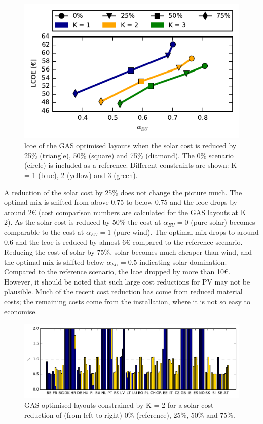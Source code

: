 \documentclass[a4paper, 5p, sort&compress]{elsarticle}%
\begin{document}
\begin{figure}[h!]
  \centering
  \includegraphics[width = \columnwidth]{solarAnalysis-new}
  \caption{\gls{lcoe} of the GAS optimised layouts when the solar cost is
    reduced by 25\% (triangle), 50\% (square) and 75\% (diamond). The
    0\% scenario (circle) is included as a reference. Different
    constraints are shown: K = 1 (blue), 2 (yellow) and 3 (green).}
  \label{fig:red-solar}
\end{figure}

A reduction of the solar cost by 25\% does not change the picture
much. The optimal mix is shifted from above 0.75 to below 0.75 and the
\gls{lcoe} drops by around 2\euro{} (cost comparison numbers are calculated
for the GAS layouts at K = 2).  As the solar cost is reduced by 50\%
the cost at $\alpha_{EU} = 0$ (pure solar) becomes comparable to the
cost at $\alpha_{EU} = 1$ (pure wind). The optimal mix drops to around
0.6 and the \gls{lcoe} is reduced by almost 6\euro{} compared to the
reference scenario. Reducing the cost of solar by 75\%, solar becomes
much cheaper than wind, and the optimal mix is shifted below
$\alpha_{EU} = 0.5$ indicating solar domination. Compared to the
reference scenario, the \gls{lcoe} dropped by more than 10\euro. However, it
should be noted that such large cost reductions for PV may not be
plausible. Much of the recent cost reduction  has come from reduced material costs; the remaining costs come from the installation, where it is not so easy to economise.

\begin{figure}[t!]
  \centering
  \includegraphics[width = 2\columnwidth, center]{solarAnalysis-layouts}
  \caption{GAS optimised layouts constrained by K = 2 for a solar cost
    reduction of (from left to right) 0\% (reference), 25\%, 50\% and
    75\%.}
  \label{fig:layout-offshore}
\end{figure}
\end{document}
